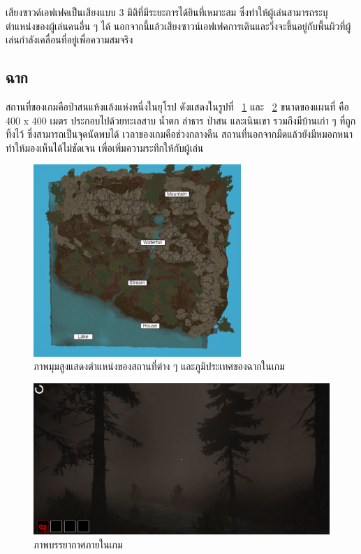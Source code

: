 เสียงซาวด์เอฟเฟคเป็นเสียงแบบ 3 มิติที่มีระยะการได้ยินที่เหมาะสม ซึ่งทำให้ผู้เล่นสามารถระบุตำแหน่งของผู้เล่นคนอื่น ๆ ได้ 
นอกจากนี้แล้วเสียงซาวน์เอฟเฟคการเดินและวิ่งจะขึ้นอยู่กับพื้นผิวที่ผู้เล่นกำลังเคลื่อนที่อยู่เพื่อความสมจริง

\subsection{ฉาก}

สถานที่ของเกมคือป่าสนแห้งแล้งแห่งหนึ่งในยุโรป ดังแสดงในรูปที่ ~\ref{fig:Map} และ ~\ref{fig:atmosphere}  ขนาดของแผนที่ คือ 400 x 400 เมตร ประกอบไปด้วยทะเลสาบ 
น้ำตก ลำธาร ป่าสน และเนินเขา รวมถึงมีบ้านเก่า ๆ ที่ถูกทิ้งไว้ ซึ่งสามารถเป็นจุดนัดพบได้ เวลาของเกมคือช่วงกลางคืน 
สถานที่นอกจากมืดแล้วยังมีหมอกหนา ทำให้มองเห็นได้ไม่ชัดเจน เพื่อเพิ่มความระทึกให้กับผู้เล่น

\begin{figure}[p]
  \begin{center}
  \includegraphics[width=0.7\textwidth]{./img/scene/WitchHunter-Map.png}
  \end{center}
  \caption[ภาพมุมสูงแสดงตำแหน่งของสถานที่ต่าง ๆ
  และภูมิประเทศของฉากในเกม]{ภาพมุมสูงแสดงตำแหน่งของสถานที่ต่าง ๆ
  และภูมิประเทศของฉากในเกม}
  \label{fig:Map}
\end{figure}

\begin{figure}[p]
  \begin{center}
  \includegraphics[width=\textwidth]{./img/scene/atmosphere.png}
  \end{center}
  \caption[ภาพบรรยากาศภายในเกม]{ภาพบรรยากาศภายในเกม}
  \label{fig:atmosphere}
\end{figure}

